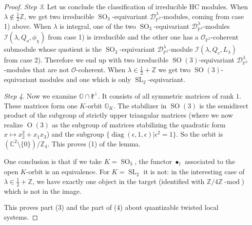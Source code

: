 \documentclass[12pt]{amsart}
\newcommand{\C}{\mathbb{C}}
\newcommand{\I}{\mathcal{I}}
\newcommand{\Orb}{\mathbb{O}}
\newcommand{\Z}{\mathbb{Z}}
\newcommand{\kf}{\mathfrak{k}}
\newcommand{\SL}{\operatorname{SL}}
\newcommand{\SO}{\operatorname{SO}}
\newcommand{\OO}{\mathcal{O}}
\theoremstyle{definition}
\numberwithin{equation}{section}
\begin{document}
\begin{proof}
{\it Step 3}. Let us conclude the classification of irreducible HC modules.
When $\lambda\not\in \frac{1}{2}\Z$,
we get two irreducible $\SO_3$-equivariant $\mathscr{D}^\lambda_{\mathbb{P}^2}$-modules, coming from case 1) above. When $\lambda$ is integral, one of the two $\operatorname{SO}_3$-equivariant $\mathscr{D}^\lambda_{\mathbb{P}^2}$-modules $\I(\lambda, Q_o, \phi_\chi)$ from case 1) is irreducible and the other one has a $\OO_{\mathbb{P}^2}$-coherent submodule whose quotient is the $\operatorname{SO}_3$-equivariant $\mathscr{D}^\lambda_{\mathbb{P}^2}$-module $\I(\lambda, Q_c, L_\lambda)$ from case 2). Therefore we end up with two irreducible $\SO(3)$-equivariant $\mathscr{D}^\lambda_{\mathbb{P}^2}$-modules that are not $\mathcal{O}$-coherent.
When $\lambda\in \frac{1}{2}+\Z$ we get two $\SO(3)$-equivariant modules and one which is only $\SL_2$-equivariant.

{\it Step 4}.
Now we examine $\Orb\cap \kf^\perp$.  It consists of all symmetric matrices of rank $1$. These matrices form one $K$-orbit $\Orb_K$. The stabilizer in $\SO(3)$ is the semidirect product of the subgroup of strictly upper triangular matrices (where we now realize $\operatorname{O}(3)$ as the subgroup of matrices stabilizing the quadratic form $x\mapsto x_2^2+x_1x_3$) and the subgroup $\{\operatorname{diag}(\epsilon,1,\epsilon)| \epsilon^2=1\}$. So the orbit
is $(\C^2\setminus \{0\})/\mathbb{Z}_4$. This proves (1) of the lemma.

One conclusion is that if we take $K=\operatorname{SO}_3$, the functor  $\bullet_{\dagger}$ associated
to the open $K$-orbit  is an equivalence. For $K=\operatorname{SL}_2$ it is not: in the interesting case
of $\lambda\in \frac{1}{2}+\Z$, we have exactly one object in the target (identified with $\Z/4\Z\operatorname{-mod}$) which is not in the image.

This proves part (3) and the part of (4) about quantizable twisted local systems.


\end{proof}
\end{document}
